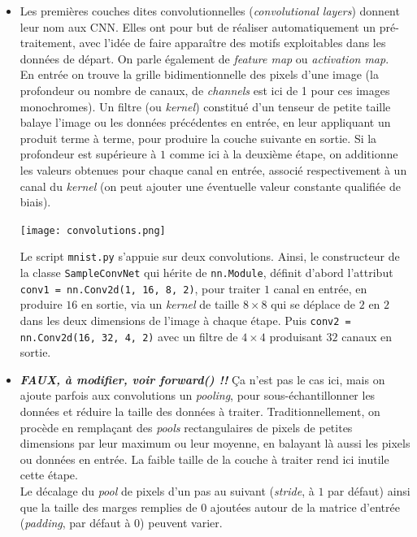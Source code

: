 \documentclass[a4paper,11pt]{article} %
\newcommand{\ttt}[1]{\texttt{#1}}
\begin{document}
\begin{itemize}
	\item
	Les premières couches dites convolutionnelles (\emph{convolutional layers}) donnent leur nom aux CNN. Elles ont pour but de réaliser automatiquement un pré-traitement, avec l'idée de faire apparaître des motifs exploitables dans les données de départ. On parle également de \emph{feature map} ou \emph{activation map}.\\
	En entrée on trouve la grille bidimentionnelle des pixels d'une image (la \og profondeur\fg{} ou nombre de canaux, de \emph{channels} est ici de 1 pour ces images monochromes). Un filtre (ou \emph{kernel}) constitué d'un tenseur de petite taille balaye l'image ou les données précédentes en entrée, en leur appliquant un produit terme à terme, pour produire la couche suivante en sortie. Si la profondeur est supérieure à $1$ comme ici à la deuxième étape, on additionne les valeurs obtenues pour chaque canal en entrée, associé respectivement à un canal du \emph{kernel} (on peut ajouter une éventuelle valeur constante qualifiée de biais).
	\begin{center}
		\texttt{[image: convolutions.png]}
	\end{center} 
	Le script \ttt{mnist.py} s'appuie sur deux convolutions. Ainsi, le constructeur de la classe \ttt{SampleConvNet} qui hérite de \ttt{nn.Module}, définit d'abord l'attribut \ttt{conv1 = nn.Conv2d(1, 16, 8, 2)}, pour traiter $1$ canal en entrée, en produire $16$ en sortie, via un \emph{kernel} de taille $8\times8$ qui se déplace de $2$ en $2$ dans les deux dimensions de l'image à chaque étape. Puis \ttt{conv2 = nn.Conv2d(16, 32, 4, 2)} avec un filtre de $4\times4$ produisant $32$ canaux en sortie.	
	\item \textbf{\emph{FAUX, à modifier, voir forward() !!}}
	Ça n'est pas le cas ici, mais on ajoute parfois aux convolutions un \emph{pooling}, pour sous-échantillonner les données et  réduire la taille des données à traiter. Traditionnellement, on procède en remplaçant des \emph{pools} rectangulaires de pixels de petites dimensions par leur maximum ou leur moyenne, en balayant là aussi les pixels ou données en entrée. La faible taille de la couche à traiter rend ici inutile cette étape.\\
	Le décalage du \emph{pool} de pixels d'un pas au suivant (\emph{stride}, à $1$ par défaut) ainsi que la taille des marges remplies de $0$ ajoutées autour de la matrice d'entrée (\emph{padding}, par défaut à $0$) peuvent varier.
	\begin{center}

\end{center}
\end{itemize}
\end{document}

